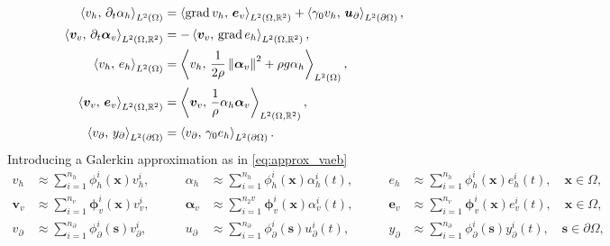 \begin{equation}\label{eq:weak_sys_shwater_grad}
\begin{aligned}
\inner[L^2(\Omega)]{{v}_h}{\partial_t {\alpha}_h} &=  \inner[L^2(\Omega, \mathbb{R}^2)]{\grad {v}_h}{\bm{e}_v} + \inner[L^2(\partial\Omega)]{\gamma_{0} {v}_h}{\bm{u}_\partial}, \\
\inner[L^2(\Omega, \mathbb{R}^2)]{\bm{v}_v}{\partial_t \bm{\alpha}_v} &=   -\inner[L^2(\Omega, \mathbb{R}^2)]{\bm{v}_v}{\grad e_h}, \\
\inner[L^2(\Omega)]{{v}_h}{{e}_h}&= \inner[L^2(\Omega)]{v_h}{\frac{1}{2 \rho} \norm{\bm{\alpha}_v}^2 + \rho g \alpha_h}, \\
\inner[L^2(\Omega, \mathbb{R}^2)]{\bm{v}_v}{\bm{e}_v}&= \inner[L^2(\Omega, \mathbb{R}^2)]{\bm{v}_v}{\frac{1}{\rho} \alpha_h \bm{\alpha}_v}, \\
\inner[L^2(\partial\Omega)]{{v}_\partial}{{y}_\partial} &= \inner[L^2(\partial\Omega)]{{v}_\partial}{\gamma_0 {e}_h}.
\end{aligned}
\end{equation}
Introducing a Galerkin approximation as in \eqref{eq:approx_vaeb}
\begin{equation}\label{eq:approxSW_vaeb}
\begin{aligned}
{v}_h &\approx \sum_{i=1}^{n_h} {\phi}_h^i(\bm{x}) v_h^i, \\
\bm{v}_v &\approx \sum_{i=1}^{n_v} \bm{\phi}_v^i(\bm{x}) v_v^i, \\
{v}_\partial &\approx \sum_{i=1}^{n_\partial} {\phi}_\partial^i(\bm{s}) v_\partial^i,
\end{aligned} \qquad 
\begin{aligned}
{\alpha}_h &\approx \sum_{i=1}^{n_h} {\phi}_h^i(\bm{x}) \alpha_h^i(t), \\
\bm{\alpha}_v &\approx \sum_{i=1}^{n_2v} \bm{\phi}_v^i(\bm{x}) \alpha_v^i(t), \\
{u}_\partial &\approx \sum_{i=1}^{n_\partial} {\phi}_\partial^i(\bm{s}) u_\partial^i(t), 
\end{aligned} \qquad 
\begin{aligned}
{e}_h &\approx \sum_{i=1}^{n_h} {\phi}_h^i(\bm{x}) e_h^i(t), \quad \bm{x} \in \Omega, \\
\bm{e}_v &\approx \sum_{i=1}^{n_v} \bm{\phi}_v^i(\bm{x}) e_v^i(t), \quad \bm{x} \in \Omega,\\
{y}_\partial &\approx \sum_{i=1}^{n_\partial} {\phi}_\partial^i(\bm{s}) y_\partial^i(t), \quad \bm{s} \in \partial\Omega,
\end{aligned}
\end{equation}
